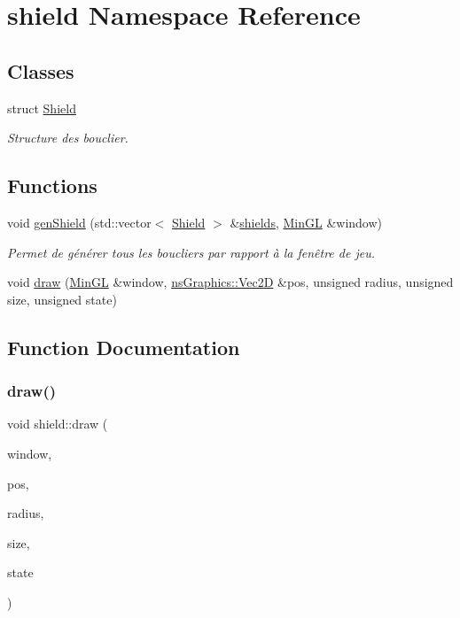 \hypertarget{namespaceshield}{}\section{shield Namespace Reference}
\label{namespaceshield}
\subsection*{Classes}
\begin{DoxyCompactItemize}
\item 
struct \hyperlink{structshield_1_1_shield}{Shield}
\begin{DoxyCompactList}\small\item\em Structure des bouclier. \end{DoxyCompactList}\end{DoxyCompactItemize}
\subsection*{Functions}
\begin{DoxyCompactItemize}
\item 
void \hyperlink{namespaceshield_a3545f41f583cca935619e05b604c02e6}{gen\+Shield} (std\+::vector$<$ \hyperlink{structshield_1_1_shield}{Shield} $>$ \&\hyperlink{multi_8cpp_a7579d4d68d6c54e66480c4518dd61d70}{shields}, \hyperlink{class_min_g_l}{Min\+GL} \&window)
\begin{DoxyCompactList}\small\item\em Permet de générer tous les boucliers par rapport à la fenêtre de jeu. \end{DoxyCompactList}\item 
void \hyperlink{namespaceshield_abbfddd54ebe829b600c5d61640984910}{draw} (\hyperlink{class_min_g_l}{Min\+GL} \&window, \hyperlink{classns_graphics_1_1_vec2_d}{ns\+Graphics\+::\+Vec2D} \&pos, unsigned radius, unsigned size, unsigned state)
\end{DoxyCompactItemize}


\subsection{Function Documentation}
\mbox{\label{namespaceshield_abbfddd54ebe829b600c5d61640984910}} 
\subsubsection{\texorpdfstring{draw()}{draw()}}
{\footnotesize\ttfamily void shield\+::draw (\begin{DoxyParamCaption}\item[{\hyperlink{class_min_g_l}{Min\+GL} \&}]{window,  }\item[{\hyperlink{classns_graphics_1_1_vec2_d}{ns\+Graphics\+::\+Vec2D} \&}]{pos,  }\item[{unsigned}]{radius,  }\item[{unsigned}]{size,  }\item[{unsigned}]{state }\end{DoxyParamCaption})}


